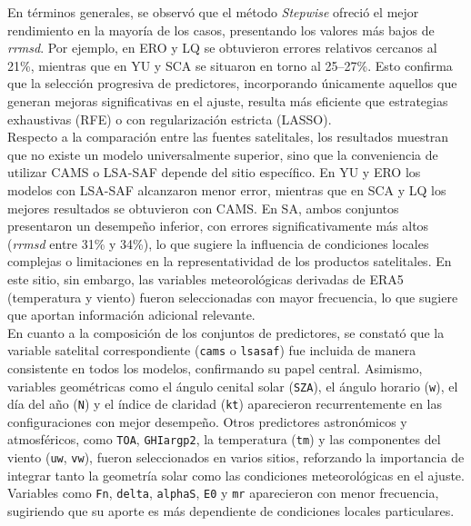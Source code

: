 En términos generales, se observó que el método \textit{Stepwise} ofreció el mejor rendimiento en la mayoría de los casos, presentando los valores más bajos de \textit{rrmsd}. Por ejemplo, en ERO y LQ se obtuvieron errores relativos cercanos al 21\%, mientras que en YU y SCA se situaron en torno al 25--27\%. Esto confirma que la selección progresiva de predictores, incorporando únicamente aquellos que generan mejoras significativas en el ajuste, resulta más eficiente que estrategias exhaustivas (RFE) o con regularización estricta (LASSO). \\

Respecto a la comparación entre las fuentes satelitales, los resultados muestran que no existe un modelo universalmente superior, sino que la conveniencia de utilizar CAMS o LSA-SAF depende del sitio específico. En YU y ERO los modelos con LSA-SAF alcanzaron menor error, mientras que en SCA y LQ los mejores resultados se obtuvieron con CAMS. En SA, ambos conjuntos presentaron un desempeño inferior, con errores significativamente más altos (\textit{rrmsd} entre 31\% y 34\%), lo que sugiere la influencia de condiciones locales complejas o limitaciones en la representatividad de los productos satelitales. En este sitio, sin embargo, las variables meteorológicas derivadas de ERA5 (temperatura y viento) fueron seleccionadas con mayor frecuencia, lo que sugiere que aportan información adicional relevante.\\

En cuanto a la composición de los conjuntos de predictores, se constató que la variable satelital correspondiente (\texttt{cams} o \texttt{lsasaf}) fue incluida de manera consistente en todos los modelos, confirmando su papel central. Asimismo, variables geométricas como el ángulo cenital solar (\texttt{SZA}), el ángulo horario (\texttt{w}), el día del año (\texttt{N}) y el índice de claridad (\texttt{kt}) aparecieron recurrentemente en las configuraciones con mejor desempeño. Otros predictores astronómicos y atmosféricos, como \texttt{TOA}, \texttt{GHIargp2}, la temperatura (\texttt{tm}) y las componentes del viento (\texttt{uw}, \texttt{vw}), fueron seleccionados en varios sitios, reforzando la importancia de integrar tanto la geometría solar como las condiciones meteorológicas en el ajuste. Variables como \texttt{Fn}, \texttt{delta}, \texttt{alphaS}, \texttt{E0} y \texttt{mr} aparecieron con menor frecuencia, sugiriendo que su aporte es más dependiente de condiciones locales particulares.

